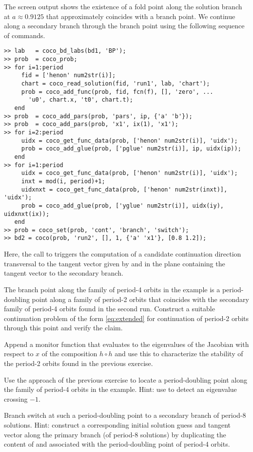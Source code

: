 The screen output shows the existence of a fold point along the solution branch at $a\approx 0.9125$ that approximately coincides with a branch point. We continue along a secondary branch through the branch point using the following sequence of commands.
\begin{lstlisting}[language=coco-highlight]
>> lab   = coco_bd_labs(bd1, 'BP');
>> prob  = coco_prob;
>> for i=1:period
     fid = ['henon' num2str(i)];
     chart = coco_read_solution(fid, 'run1', lab, 'chart');
     prob = coco_add_func(prob, fid, fcn(f), [], 'zero', ...
       'u0', chart.x, 't0', chart.t);
   end
>> prob  = coco_add_pars(prob, 'pars', ip, {'a' 'b'});
>> prob  = coco_add_pars(prob, 'x1', ix(1), 'x1');
>> for i=2:period
     uidx = coco_get_func_data(prob, ['henon' num2str(i)], 'uidx');
     prob = coco_add_glue(prob, ['pglue' num2str(i)], ip, uidx(ip));
   end
>> for i=1:period
     uidx = coco_get_func_data(prob, ['henon' num2str(i)], 'uidx');
     inxt = mod(i, period)+1;
     uidxnxt = coco_get_func_data(prob, ['henon' num2str(inxt)], 'uidx');
     prob = coco_add_glue(prob, ['yglue' num2str(i)], uidx(iy), uidxnxt(ix));
   end
>> prob = coco_set(prob, 'cont', 'branch', 'switch');
>> bd2 = coco(prob, 'run2', [], 1, {'a' 'x1'}, [0.8 1.2]);
\end{lstlisting}
Here, the call to  triggers the computation of a candidate continuation direction transversal to the tangent vector given by  and in the plane containing the tangent vector to the secondary branch.

\begin{exercises}
\item The branch point along the family of period-4 orbits in the example is a period-doubling point along a family of period-2 orbits that coincides with the secondary family of period-4 orbits found in the second run. Construct a suitable continuation problem of the form \eqref{eq:extended} for continuation of period-2 orbits through this point and verify the claim.
\item Append a monitor function that evaluates to the eigenvalues of the Jacobian with respect to $x$ of the composition $h\circ h$ and use this to characterize the stability of the period-2 orbits found in the previous exercise.
\item Use the approach of the previous exercise to locate a period-doubling point along the family of period-4 orbits in the example. Hint: use  to detect an eigenvalue crossing $-1$.
\item Branch switch at such a period-doubling point to a secondary branch of period-8 solutions. Hint: construct a corresponding initial solution guess and tangent vector along the primary branch (of period-8 solutions) by duplicating the content of  and  associated with the period-doubling point of period-4 orbits.
\end{exercises}

